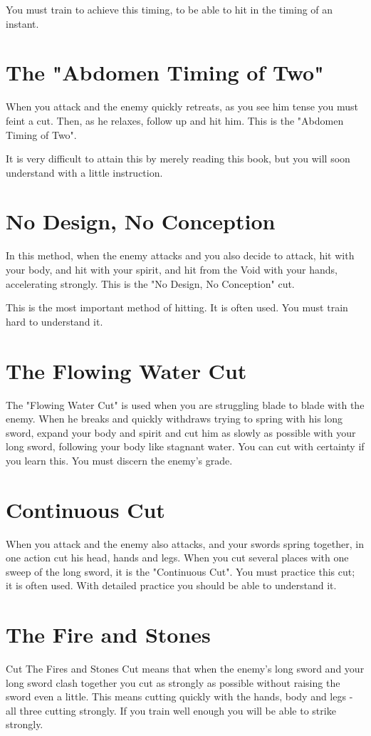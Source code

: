 \documentclass[12pt]{report}
\begin{document}
You must train to achieve this timing, to be able to hit in the timing of an instant.
\section*{The "Abdomen Timing of Two"}
When you attack and the enemy quickly retreats, as you see him tense you must feint a cut. Then, as he relaxes, follow up and hit him. This is the "Abdomen Timing of Two".

It is very difficult to attain this by merely reading this book, but you will soon understand with a little instruction.
\section*{No Design, No Conception}
In this method, when the enemy attacks and you also decide to attack, hit with your body, and hit with your spirit, and hit from the Void with your hands, accelerating strongly. This is the "No Design, No Conception" cut.

This is the most important method of hitting. It is often used. You must train hard to understand it.
\section*{The Flowing Water Cut}
The "Flowing Water Cut" is used when you are struggling blade to blade with the enemy. When he breaks and quickly withdraws trying to spring with his long sword, expand your body and spirit and cut him as slowly as possible with your long sword, following your body like stagnant water. You can cut with certainty if you learn this. You must discern the enemy's grade.
\section*{Continuous Cut}
When you attack and the enemy also attacks, and your swords spring together, in one action cut his head, hands and legs. When you cut several places with one sweep of the long sword, it is the "Continuous Cut". You must practice this cut; it is often used. With detailed practice you should be able to understand it.
\section*{The Fire and Stones}

Cut The Fires and Stones Cut means that when the enemy's long sword and your long sword clash together you cut as strongly as possible without raising the sword even a little. This means cutting quickly with the hands, body and legs - all three cutting strongly. If you train well enough you will be able to strike strongly.
\end{document}
